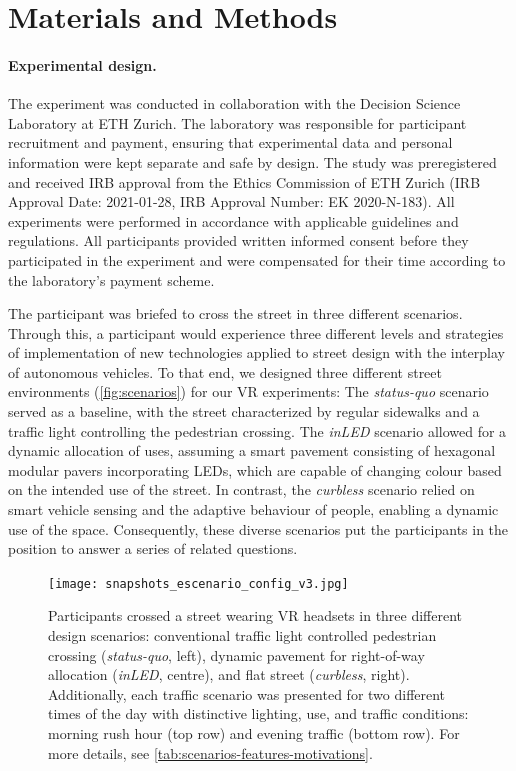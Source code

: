 \section{Materials and Methods}\label{sec:MaterialsAndMethods}

\paragraph{Experimental design.}
The experiment was conducted in collaboration with the Decision Science Laboratory at ETH Zurich. The laboratory was responsible for participant recruitment and payment, ensuring that experimental data and personal information were kept separate and safe by design. The study was preregistered \cite{ArgotaSanchez-Vaquerizo2022} and received IRB approval from the Ethics Commission of ETH Zurich (IRB Approval Date: 2021-01-28, IRB Approval Number: EK 2020-N-183). All experiments were performed in accordance with applicable guidelines and regulations. All participants provided written informed consent before they participated in the experiment and were compensated for their time according to the laboratory's payment scheme.

The participant was briefed to cross the street in three different scenarios. Through this, a participant would experience three different levels and strategies of implementation of new technologies applied to street design with the interplay of autonomous vehicles. 
To that end, we designed three different street environments (\autoref{fig:scenarios}) for our VR experiments:
The \emph{status-quo} scenario served as a baseline, with the street characterized by regular sidewalks and a traffic light controlling the pedestrian crossing.
The \emph{inLED} scenario allowed for a dynamic allocation of uses, assuming a smart pavement consisting of hexagonal modular pavers \cite{Ratti2018,Larrard2013} incorporating LEDs, which are capable of changing colour based on the intended use of the street.
In contrast, the \emph{curbless} scenario relied on smart vehicle sensing and the adaptive behaviour of people, enabling a dynamic use of the space.
Consequently, these diverse scenarios put the participants in the position to answer a series of related questions.

\begin{figure}[ht]
\centering
\texttt{[image: snapshots\_escenario\_config\_v3.jpg]}
\caption{Participants crossed a street wearing VR headsets in three different design scenarios: conventional traffic light controlled pedestrian crossing (\emph{status-quo}, left), dynamic pavement for right-of-way allocation (\emph{inLED}, centre), and flat street (\emph{curbless}, right). Additionally, each traffic scenario was presented for two different times of the day with distinctive lighting, use, and traffic conditions: morning rush hour (top row) and evening traffic (bottom row). For more details, see \autoref{tab:scenarios-features-motivations}.}
\label{fig:scenarios}
\end{figure}

